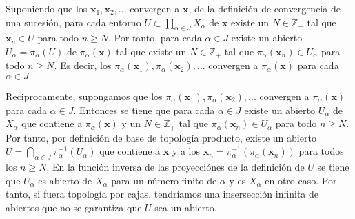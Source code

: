 \documentclass{article}
\newcommand{\vect}[1]{\boldsymbol{#1}}
\begin{document}
Suponiendo que los $\vect{x}_1,\vect{x}_2,...$ convergen a $\vect{x}$, de la definición de convergencia de una sucesión, para cada entorno $U\subset \prod_{\alpha\in J}X_\alpha$ de $\vect{x}$ existe un $N\in \mathbb{Z}_+$ tal que $\vect{x}_{n}\in U$ para todo $n\geq N$. Por tanto, para cada $\alpha \in J$ existe un abierto $U_\alpha =\pi_\alpha(U)$ de $\pi_\alpha(\vect{x})$ tal que existe un $N\in \mathbb{Z}_+$ tal que $\pi_\alpha(\vect{x}_{n})\in U_\alpha$ para todo $n\geq N$. Es decir, los $\pi_\alpha(\vect{x}_1),\pi_\alpha(\vect{x}_2),...$ convergen a $\pi_\alpha(\vect{x})$ para cada $\alpha \in J$

Reciprocamente, supongamos que
los $\pi_\alpha(\vect{x}_1),\pi_\alpha(\vect{x}_2),...$ convergen a $\pi_\alpha(\vect{x})$ para cada $\alpha \in J$. Entonces se tiene que para cada $\alpha \in J$ existe un abierto $U_\alpha$ de $X_\alpha$ que contiene a $\pi_\alpha(\vect{x})$ y un $N\in \mathbb{Z}_+$ tal que $\pi_\alpha(\vect{x}_{n})\in U_\alpha$ para todo $n\geq N$. Por tanto, por definición de base de topología producto,  existe un abierto $U=\bigcap_{\alpha \in J}\pi^{-1}_{\alpha}(U_\alpha)$ que contiene a $\vect{x}$ y a los $\vect{x}_n=\pi^{-1}_\alpha(\pi_\alpha(\vect{x}_n))$ para todos los $n\geq N$. En la función inversa de las proyecciónes de la definición de $U$ se tiene que $U_\alpha$ es abierto de $X_\alpha$ para un número finito de $\alpha$ y es $X_\alpha$ en otro caso. Por tanto, si fuera topología por cajas, tendríamos una insersección infinita de abiertos que no se garantiza que $U$ sea un abierto.
\end{document}
